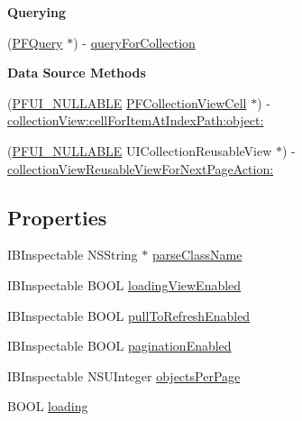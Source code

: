 \begin{Indent}{\bf Querying}\par
{\em 

 

 }\begin{DoxyCompactItemize}
\item 
(\hyperlink{interface_p_f_query}{P\+F\+Query} $\ast$) -\/ \hyperlink{interface_p_f_query_collection_view_controller_a99af0f169ec01b00da799a1cb45b7027}{query\+For\+Collection}
\end{DoxyCompactItemize}
\end{Indent}
\begin{Indent}{\bf Data Source Methods}\par
{\em 

 

 }\begin{DoxyCompactItemize}
\item 
(\hyperlink{_parse_u_i_constants_8h_af6e64a847348a9ac2a77923670373fe8}{P\+F\+U\+I\+\_\+\+N\+U\+L\+L\+A\+B\+L\+E} \hyperlink{interface_p_f_collection_view_cell}{P\+F\+Collection\+View\+Cell} $\ast$) -\/ \hyperlink{interface_p_f_query_collection_view_controller_a61f11bba659cca616766048f2ad24a8a}{collection\+View\+:cell\+For\+Item\+At\+Index\+Path\+:object\+:}
\item 
(\hyperlink{_parse_u_i_constants_8h_af6e64a847348a9ac2a77923670373fe8}{P\+F\+U\+I\+\_\+\+N\+U\+L\+L\+A\+B\+L\+E} U\+I\+Collection\+Reusable\+View $\ast$) -\/ \hyperlink{interface_p_f_query_collection_view_controller_a1a8271346b3dd19205d38e7b493b01a0}{collection\+View\+Reusable\+View\+For\+Next\+Page\+Action\+:}
\end{DoxyCompactItemize}
\end{Indent}
\subsection*{Properties}
\begin{DoxyCompactItemize}
\item 
I\+B\+Inspectable N\+S\+String $\ast$ \hyperlink{interface_p_f_query_collection_view_controller_a78ef068278e2ba0354358f7c68155547}{parse\+Class\+Name}
\item 
I\+B\+Inspectable B\+O\+O\+L \hyperlink{interface_p_f_query_collection_view_controller_abf284e942b6631b132cc303d4591149e}{loading\+View\+Enabled}
\item 
I\+B\+Inspectable B\+O\+O\+L \hyperlink{interface_p_f_query_collection_view_controller_ac90e0f5906f3e8cc93f2221b71b4ea4c}{pull\+To\+Refresh\+Enabled}
\item 
I\+B\+Inspectable B\+O\+O\+L \hyperlink{interface_p_f_query_collection_view_controller_a28c0a0d62e1c36a171f19dac89b5fe82}{pagination\+Enabled}
\item 
I\+B\+Inspectable N\+S\+U\+Integer \hyperlink{interface_p_f_query_collection_view_controller_afb8b2f184f0eff2f763f2e77aae9dd0b}{objects\+Per\+Page}
\item 
B\+O\+O\+L \hyperlink{interface_p_f_query_collection_view_controller_a68ba6683404635bb5ac0834b6c125f0f}{loading}
\end{DoxyCompactItemize}
